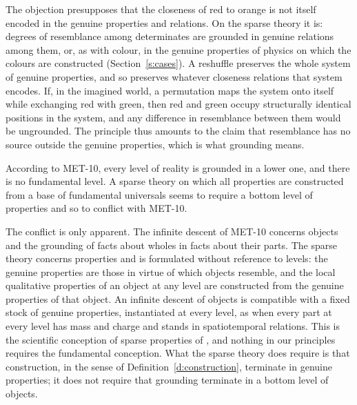 \documentclass{situationist-preprint}
\begin{document}
\begin{reply}
The objection presupposes that the closeness of red to orange is not itself encoded in the genuine properties and relations. On the sparse theory it is: degrees of resemblance among determinates are grounded in genuine relations among them, or, as with colour, in the genuine properties of physics on which the colours are constructed (Section~\ref{s:cases}). A reshuffle preserves the whole system of genuine properties, and so preserves whatever closeness relations that system encodes. If, in the imagined world, a permutation maps the system onto itself while exchanging red with green, then red and green occupy structurally identical positions in the system, and any difference in resemblance between them would be ungrounded. The principle thus amounts to the claim that resemblance has no source outside the genuine properties, which is what grounding means.
\end{reply}

\begin{objection}\label{o:level}
According to MET-10, every level of reality is grounded in a lower one, and there is no fundamental level. A sparse theory on which all properties are constructed from a base of fundamental universals seems to require a bottom level of properties and so to conflict with MET-10.
\end{objection}

\begin{reply}
The conflict is only apparent. The infinite descent of MET-10 concerns objects and the grounding of facts about wholes in facts about their parts. The sparse theory concerns properties and is formulated without reference to levels: the genuine properties are those in virtue of which objects resemble, and the local qualitative properties of an object at any level are constructed from the genuine properties of that object. An infinite descent of objects is compatible with a fixed stock of genuine properties, instantiated at every level, as when every part at every level has mass and charge and stands in spatiotemporal relations. This is the scientific conception of sparse properties of \citet{Schaffer2004}, and nothing in our principles requires the fundamental conception. What the sparse theory does require is that construction, in the sense of Definition~\ref{d:construction}, terminate in genuine properties; it does not require that grounding terminate in a bottom level of objects.
\end{reply}
\end{document}
